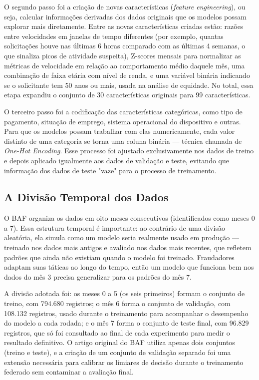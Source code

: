 O segundo passo foi a criação de novas características (\textit{feature engineering}), ou seja, calcular informações derivadas dos dados originais que os modelos possam explorar mais diretamente. Entre as novas características criadas estão: razões entre velocidades em janelas de tempo diferentes (por exemplo, quantas solicitações houve nas últimas 6 horas comparado com as últimas 4 semanas, o que sinaliza picos de atividade suspeita), Z-scores mensais para normalizar as métricas de velocidade em relação ao comportamento médio daquele mês, uma combinação de faixa etária com nível de renda, e uma variável binária indicando se o solicitante tem 50 anos ou mais, usada na análise de equidade. No total, essa etapa expandiu o conjunto de 30 características originais para 99 características.

O terceiro passo foi a codificação das características categóricas, como tipo de pagamento, situação de emprego, sistema operacional do dispositivo e outras. Para que os modelos possam trabalhar com elas numericamente, cada valor distinto de uma categoria se torna uma coluna binária --- técnica chamada de \textit{One-Hot Encoding}. Esse processo foi ajustado exclusivamente nos dados de treino e depois aplicado igualmente aos dados de validação e teste, evitando que informação dos dados de teste "vaze" para o processo de treinamento.

\subsection{A Divisão Temporal dos Dados}

O BAF organiza os dados em oito meses consecutivos (identificados como meses 0 a 7). Essa estrutura temporal é importante: ao contrário de uma divisão aleatória, ela simula como um modelo seria realmente usado em produção --- treinado nos dados mais antigos e avaliado nos dados mais recentes, que refletem padrões que ainda não existiam quando o modelo foi treinado. Fraudadores adaptam suas táticas ao longo do tempo, então um modelo que funciona bem nos dados do mês 3 precisa generalizar para os padrões do mês 7.

A divisão adotada foi: os meses 0 a 5 (os seis primeiros) formam o conjunto de treino, com 794.680 registros; o mês 6 forma o conjunto de validação, com 108.132 registros, usado durante o treinamento para acompanhar o desempenho do modelo a cada rodada; e o mês 7 forma o conjunto de teste final, com 96.829 registros, que só foi consultado ao final de cada experimento para medir o resultado definitivo. O artigo original do BAF utiliza apenas dois conjuntos (treino e teste), e a criação de um conjunto de validação separado foi uma extensão necessária para calibrar os limiares de decisão durante o treinamento federado sem contaminar a avaliação final.

